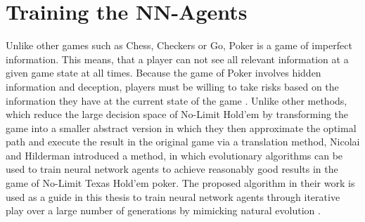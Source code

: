 \section{Training the NN-Agents}
Unlike other games such as Chess, Checkers or Go, Poker is a game of imperfect information. This means, that a player can not see all relevant  information at a given game state at all times. Because the game of Poker involves hidden information and deception, players must be willing to take risks based on the information they have at the current state of the game \cite{nn_evolve}. Unlike other methods, which reduce the large decision space of No-Limit Hold'em by transforming the game into a smaller abstract version in which they then approximate the optimal path and execute the result in the original game via a translation method, Nicolai and Hilderman \cite{nn_evolve} introduced a method, in which evolutionary algorithms can be used to train neural network agents to achieve reasonably good results in the game of No-Limit Texas Hold'em poker. The proposed algorithm in their work is used as a guide in this thesis to train neural network agents through iterative play over a large number of generations by mimicking natural evolution \cite{nn_evolve}.
